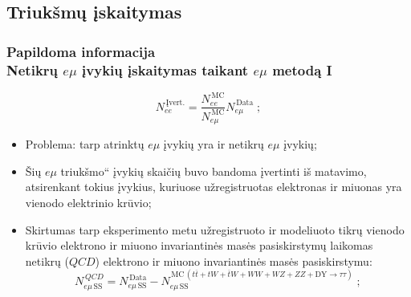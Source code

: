 \documentclass[xcolor=dvipsnames]{beamer}
\newcommand{\emu}{\mathit{e}\mu}
\newcommand{\ee}{\mathit{ee}}
\newcommand{\WW}{\mathit{WW}}
\newcommand{\ZZ}{\mathit{ZZ}}
\newcommand{\WZ}{\mathit{WZ}}
\newcommand{\DYtau}{\mathrm{DY} \! \rightarrow \! \tau\tau}
\newcommand{\QCD}{\mathit{QCD}}
\newcommand{\ttbar}{\mathit{t}\overline{\mathit{t}}}
\newcommand{\tbarW}{\overline{\mathit{t}}\mathit{W}}
\newcommand{\tW}{\mathit{tW}}
\newcommand{\MC}{\mathrm{MC}}
\newcommand{\Data}{\mathrm{Data}}
\begin{document}
\begin{frame}
	\subsection{Triukšmų įskaitymas}
	\frametitle{Papildoma informacija\\ \small Netikrų $\emu$ įvykių įskaitymas taikant $\emu$ metodą I}
	\begin{equation*}
		\mathit{N_{ee}^{\,\mathrm{Įvert.}}} = \frac{\mathit{N}_{\ee}^{\,\mathrm{MC}}}{\mathit{N}_{\emu}^{\,\mathrm{MC}}}
											\mathit{N}_{\emu}^{\,\mathrm{Data}} \; ;
	\end{equation*}
	\begin{itemize}
		\item Problema: tarp atrinktų $\emu$ įvykių yra ir netikrų $\emu$ įvykių;
		\item Šių \quotedblbase{}$\emu$ triukšmo\textquotedblleft{} įvykių skaičių buvo bandoma įvertinti iš matavimo, atsirenkant tokius įvykius,
		kuriuose užregistruotas elektronas ir miuonas yra vienodo elektrinio krūvio;
		\item Skirtumas tarp eksperimento metu užregistruoto ir modeliuoto tikrų vienodo krūvio elektrono ir miuono
		invariantinės masės pasiskirstymų laikomas netikrų ($\QCD$) elektrono ir miuono invariantinės masės pasiskirstymu:
		\begin{equation*}
			\mathit{N}_{\emu \, \mathrm{SS}}^{\,\QCD} = \mathit{N}_{\emu \, \mathrm{SS}}^{\,\Data} -
													  \mathit{N}_{\emu \, \mathrm{SS}}^{\,\MC \, (\ttbar + \tW + \tbarW + \WW + \WZ + \ZZ + \DYtau)} \; ;
		\end{equation*}
	\end{itemize}
\end{frame}
\end{document}
